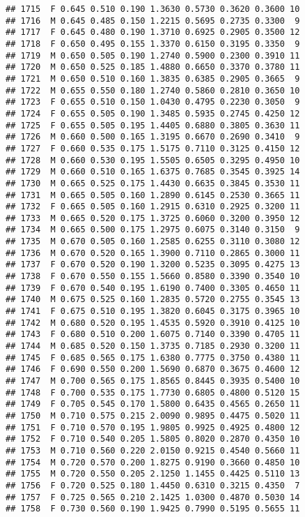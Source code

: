 \documentclass[
]{article}
\begin{document}
\begin{verbatim}
## 1715  F 0.645 0.510 0.190 1.3630 0.5730 0.3620 0.3600 10
## 1716  M 0.645 0.485 0.150 1.2215 0.5695 0.2735 0.3300  9
## 1717  F 0.645 0.480 0.190 1.3710 0.6925 0.2905 0.3500 12
## 1718  F 0.650 0.495 0.155 1.3370 0.6150 0.3195 0.3350  9
## 1719  M 0.650 0.505 0.190 1.2740 0.5900 0.2300 0.3910 11
## 1720  M 0.650 0.525 0.185 1.4880 0.6650 0.3370 0.3780 11
## 1721  M 0.650 0.510 0.160 1.3835 0.6385 0.2905 0.3665  9
## 1722  M 0.655 0.550 0.180 1.2740 0.5860 0.2810 0.3650 10
## 1723  F 0.655 0.510 0.150 1.0430 0.4795 0.2230 0.3050  9
## 1724  F 0.655 0.505 0.190 1.3485 0.5935 0.2745 0.4250 12
## 1725  F 0.655 0.505 0.195 1.4405 0.6880 0.3805 0.3630 11
## 1726  M 0.660 0.500 0.165 1.3195 0.6670 0.2690 0.3410  9
## 1727  F 0.660 0.535 0.175 1.5175 0.7110 0.3125 0.4150 12
## 1728  M 0.660 0.530 0.195 1.5505 0.6505 0.3295 0.4950 10
## 1729  M 0.660 0.510 0.165 1.6375 0.7685 0.3545 0.3925 14
## 1730  M 0.665 0.525 0.175 1.4430 0.6635 0.3845 0.3530 11
## 1731  M 0.665 0.505 0.160 1.2890 0.6145 0.2530 0.3665 11
## 1732  F 0.665 0.505 0.160 1.2915 0.6310 0.2925 0.3200 11
## 1733  M 0.665 0.520 0.175 1.3725 0.6060 0.3200 0.3950 12
## 1734  M 0.665 0.500 0.175 1.2975 0.6075 0.3140 0.3150  9
## 1735  M 0.670 0.505 0.160 1.2585 0.6255 0.3110 0.3080 12
## 1736  M 0.670 0.520 0.165 1.3900 0.7110 0.2865 0.3000 11
## 1737  F 0.670 0.520 0.190 1.3200 0.5235 0.3095 0.4275 13
## 1738  F 0.670 0.550 0.155 1.5660 0.8580 0.3390 0.3540 10
## 1739  F 0.670 0.540 0.195 1.6190 0.7400 0.3305 0.4650 11
## 1740  M 0.675 0.525 0.160 1.2835 0.5720 0.2755 0.3545 13
## 1741  F 0.675 0.510 0.195 1.3820 0.6045 0.3175 0.3965 10
## 1742  M 0.680 0.520 0.195 1.4535 0.5920 0.3910 0.4125 10
## 1743  F 0.680 0.510 0.200 1.6075 0.7140 0.3390 0.4705 11
## 1744  M 0.685 0.520 0.150 1.3735 0.7185 0.2930 0.3200 11
## 1745  F 0.685 0.565 0.175 1.6380 0.7775 0.3750 0.4380 11
## 1746  F 0.690 0.550 0.200 1.5690 0.6870 0.3675 0.4600 12
## 1747  M 0.700 0.565 0.175 1.8565 0.8445 0.3935 0.5400 10
## 1748  F 0.700 0.535 0.175 1.7730 0.6805 0.4800 0.5120 15
## 1749  F 0.705 0.545 0.170 1.5800 0.6435 0.4565 0.2650 11
## 1750  M 0.710 0.575 0.215 2.0090 0.9895 0.4475 0.5020 11
## 1751  F 0.710 0.570 0.195 1.9805 0.9925 0.4925 0.4800 12
## 1752  F 0.710 0.540 0.205 1.5805 0.8020 0.2870 0.4350 10
## 1753  M 0.710 0.560 0.220 2.0150 0.9215 0.4540 0.5660 11
## 1754  M 0.720 0.570 0.200 1.8275 0.9190 0.3660 0.4850 10
## 1755  M 0.720 0.550 0.205 2.1250 1.1455 0.4425 0.5110 13
## 1756  F 0.720 0.525 0.180 1.4450 0.6310 0.3215 0.4350  7
## 1757  F 0.725 0.565 0.210 2.1425 1.0300 0.4870 0.5030 14
## 1758  F 0.730 0.560 0.190 1.9425 0.7990 0.5195 0.5655 11

\end{verbatim}
\end{document}
